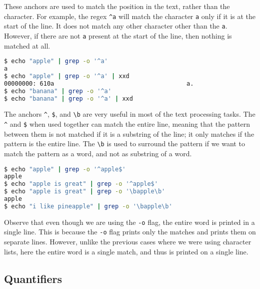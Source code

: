 These anchors are used to match the position in the text, rather than the character. For example, the regex \lstinline|^a| will match the character \lstinline|a| only if it is at the start of the line. It does not match any other character other than the \lstinline|a|. However, if there are not \lstinline|a| present at the start of the line, then nothing is matched at all.

\begin{lstlisting}[language=bash]
$ echo "apple" | grep -o '^a'
a
$ echo "apple" | grep -o '^a' | xxd
00000000: 610a                                     a.
$ echo "banana" | grep -o '^a'
$ echo "banana" | grep -o '^a' | xxd
\end{lstlisting}

The anchors
\lstinline|^|,
\lstinline|$|, and
\lstinline|\b|
are very useful in most of the text processing tasks. The \lstinline|^| and
\lstinline|$| when used together can match the entire line, meaning that the
pattern between them is not matched if it is a substring of the line; it
only matches if the pattern is the entire line. The \lstinline|\b| is used
to surround the pattern if we want to match the pattern as a word, and not
as substring of a word.

\begin{lstlisting}[language=bash]
$ echo "apple" | grep -o '^apple$'
apple
$ echo "apple is great" | grep -o '^apple$'
$ echo "apple is great" | grep -o '\bapple\b'
apple
$ echo "i like pineapple" | grep -o '\bapple\b'
\end{lstlisting}

Observe that even though we are using the \lstinline|-o| flag, the entire word
is printed in a single line. This is because the \lstinline|-o| flag prints
only the matches and prints them on separate lines. However, unlike the previous
cases where we were using character lists, here the entire word is a single match,
and thus is printed on a single line.

\subsection{Quantifiers}

